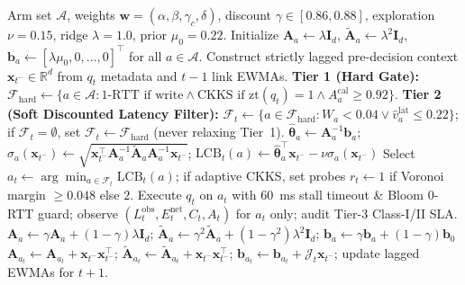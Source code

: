 \documentclass[10pt,journal,compsoc]{IEEEtran}
\begin{document}
\begin{algorithm}[!t]
\caption{CAPQ-Pareto Three-Tier Bounded Causal Discounted-LinUCB}
\label{alg:capq}
\begin{algorithmic}[1]
\scriptsize
\REQUIRE Arm set $\mathcal{A}$, weights $\mathbf{w}=(\alpha,\beta,\gamma_c,\delta)$, discount $\gamma \in [0.86, 0.88]$, exploration $\nu=0.15$, ridge $\lambda=1.0$, prior $\mu_0=0.22$.
\STATE Initialize $\mathbf{A}_{a} \leftarrow \lambda \mathbf{I}_d$, $\tilde{\mathbf{A}}_{a} \leftarrow \lambda^2 \mathbf{I}_d$, $\mathbf{b}_{a} \leftarrow [\lambda\mu_0, 0, \dots, 0]^\top$ for all $a \in \mathcal{A}$.
    \STATE Construct strictly lagged pre-decision context $\mathbf{x}_{t^-} \in \mathbb{R}^d$ from $q_t$ metadata and $t-1$ link EWMAs.
    \STATE \textbf{Tier 1 (Hard Gate):} $\mathcal{F}_{\mathrm{hard}} \leftarrow \{a \in \mathcal{A} : \text{1-RTT if write} \land \text{CKKS if }\mathrm{zt}(q_t)=1 \land A_a^{\mathrm{cal}} \ge 0.92\}$.
    \STATE \textbf{Tier 2 (Soft Discounted Latency Filter):} $\mathcal{F}_t \leftarrow \{a \in \mathcal{F}_{\mathrm{hard}} : W_a < 0.04 \lor \hat{v}_a^{\mathrm{lat}} \le 0.22\}$; if $\mathcal{F}_t = \emptyset$, set $\mathcal{F}_t \leftarrow \mathcal{F}_{\mathrm{hard}}$ (never relaxing Tier~1).
        \STATE $\hat{\boldsymbol{\theta}}_a \leftarrow \mathbf{A}_a^{-1}\mathbf{b}_a$; \quad $\sigma_a(\mathbf{x}_{t^-}) \leftarrow \sqrt{\mathbf{x}_{t^-}^\top \mathbf{A}_a^{-1}\tilde{\mathbf{A}}_a \mathbf{A}_a^{-1}\mathbf{x}_{t^-}}$; \quad $\mathrm{LCB}_t(a) \leftarrow \hat{\boldsymbol{\theta}}_a^\top \mathbf{x}_{t^-} - \nu \sigma_a(\mathbf{x}_{t^-})$
    \ENDFOR
    \STATE Select $a_t \leftarrow \arg\min_{a \in \mathcal{F}_t} \mathrm{LCB}_t(a)$; if adaptive CKKS, set probes $r_t \leftarrow 1$ if Voronoi margin $\ge 0.048$ else $2$.
    \STATE Execute $q_t$ on $a_t$ with $60$~ms stall timeout \& Bloom 0-RTT guard; observe $(L_t^{\mathrm{obs}}, E_t^{\mathrm{net}}, C_t, A_t)$ for $a_t$ only; audit Tier-3 Class-I/II SLA.
        \STATE $\mathbf{A}_a \leftarrow \gamma \mathbf{A}_a + (1-\gamma)\lambda\mathbf{I}_d$; \; $\tilde{\mathbf{A}}_a \leftarrow \gamma^2 \tilde{\mathbf{A}}_a + (1-\gamma^2)\lambda^2\mathbf{I}_d$; \; $\mathbf{b}_a \leftarrow \gamma \mathbf{b}_a + (1-\gamma)\mathbf{b}_0$
    \ENDFOR
    \STATE $\mathbf{A}_{a_t} \leftarrow \mathbf{A}_{a_t} + \mathbf{x}_{t^-}\mathbf{x}_{t^-}^\top$; \; $\tilde{\mathbf{A}}_{a_t} \leftarrow \tilde{\mathbf{A}}_{a_t} + \mathbf{x}_{t^-}\mathbf{x}_{t^-}^\top$; \; $\mathbf{b}_{a_t} \leftarrow \mathbf{b}_{a_t} + \mathcal{J}_t \mathbf{x}_{t^-}$; update lagged EWMAs for $t+1$.
\ENDFOR
\end{algorithmic}
\end{algorithm}
\end{document}
